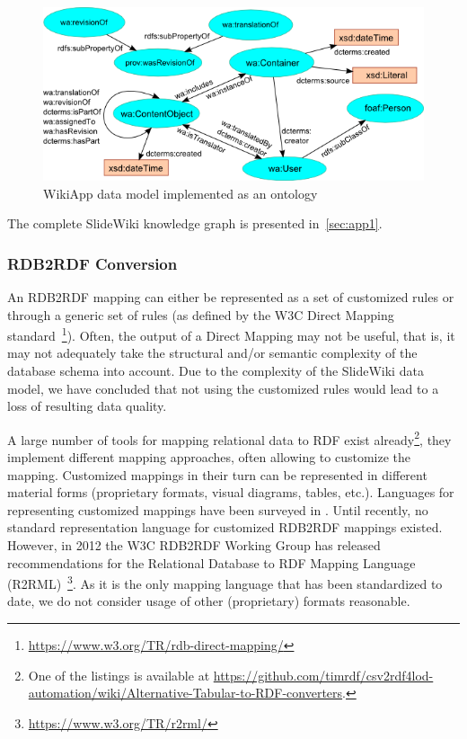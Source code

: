 \documentclass[ngerman,UKenglish,table]{scrbook}
\begin{document}
\begin{figure}[htb]
	\centering
		\includegraphics[width=\textwidth]{images/wa_ontology.png}
	\caption{WikiApp data model implemented as an ontology}
	\label{fig:wa_ontology}
\end{figure}

The complete SlideWiki knowledge graph is presented in~\autoref{sec:app1}.

\subsubsection{RDB2RDF Conversion}
\label{sec:RDB2RDF}

An RDB2RDF mapping can either be represented as a set of customized rules or through a generic set of rules (as defined by the W3C Direct Mapping standard~\footnote{\url{https://www.w3.org/TR/rdb-direct-mapping/}}).
Often, the output of a Direct Mapping may not be useful, that is, it may not adequately take the structural and/or semantic complexity of the database schema into account.
Due to the complexity of the SlideWiki data model, we have concluded that not using the customized rules would lead to a loss of resulting data quality. 

A large number of tools for mapping relational data to RDF exist already\footnote{One of the listings is available at \url{https://github.com/timrdf/csv2rdf4lod-automation/wiki/Alternative-Tabular-to-RDF-converters}.}, they implement different mapping approaches, often allowing to customize the mapping. Customized mappings in their turn can be represented in different material forms (proprietary formats, visual diagrams, tables, etc.).
Languages for representing customized mappings have been surveyed in \cite{spanos2012bringing}.
Until recently, no standard representation language for customized RDB2RDF mappings existed.
However, in 2012 the W3C RDB2RDF Working Group has released recommendations for the Relational Database to RDF Mapping Language (R2RML)~\footnote{\url{https://www.w3.org/TR/r2rml/}}.
As it is the only mapping language that has been standardized to date, we do not consider usage of other (proprietary) formats reasonable. 
\end{document}
